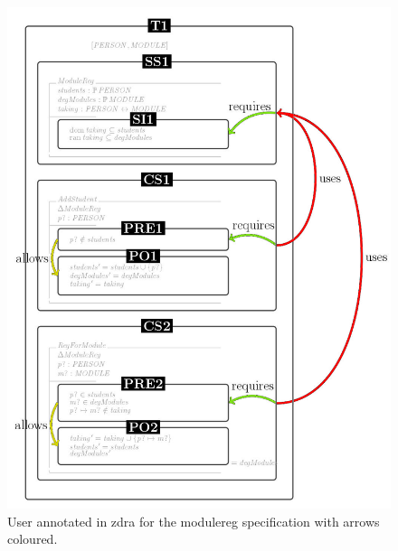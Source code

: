 \begin{figure}[H]
\centering
\includegraphics[scale=0.7]{Figures/Formalising/dramodule.png}
\caption{User annotated in \gls{zdra} for the modulereg specification with arrows coloured. \label{fig:zdramodule}}
\end{figure}


